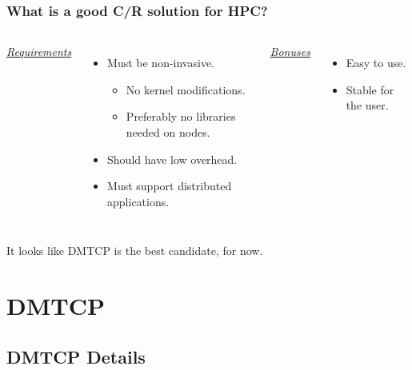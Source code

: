 \documentclass[compress]{beamer}
\begin{document}
\begin{frame}
\frametitle{What is a good C/R solution for HPC?}

\begin{columns}[t]
\ul{\textit{Requirements}}
\begin{itemize}
\item Must be non-invasive.
  \begin{itemize}
  \item No kernel modifications.
  \item Preferably no libraries needed on nodes.
  \end{itemize}
\item Should have low overhead.
\item Must support distributed applications.
\end{itemize}

\ul{\textit{Bonuses}}
\begin{itemize}
\item Easy to use.
\item Stable for the user.
\end{itemize}

\end{columns}

\vspace{2ex}
It looks like DMTCP is the best candidate, for now.




\end{frame}



\section{DMTCP}        %

\subsection{DMTCP Details}    %
\end{document}
